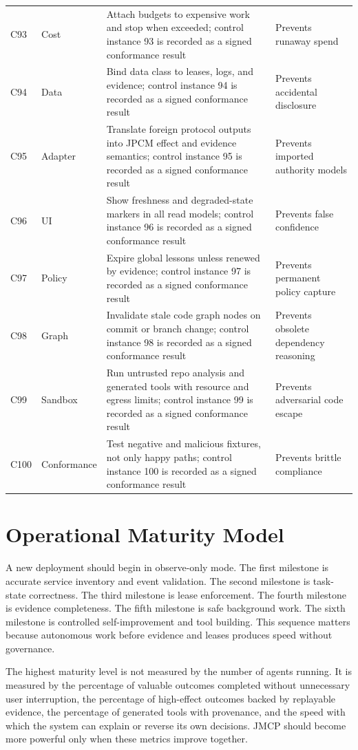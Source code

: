 \documentclass[10pt,journal,onecolumn]{IEEEtran}
\begin{document}
\begin{longtable}{P{0.06\textwidth} P{0.14\textwidth} P{0.48\textwidth} P{0.24\textwidth}}
C93 & Cost & Attach budgets to expensive work and stop when exceeded; control instance 93 is recorded as a signed conformance result & Prevents runaway spend \\
C94 & Data & Bind data class to leases, logs, and evidence; control instance 94 is recorded as a signed conformance result & Prevents accidental disclosure \\
C95 & Adapter & Translate foreign protocol outputs into JPCM effect and evidence semantics; control instance 95 is recorded as a signed conformance result & Prevents imported authority models \\
C96 & UI & Show freshness and degraded-state markers in all read models; control instance 96 is recorded as a signed conformance result & Prevents false confidence \\
C97 & Policy & Expire global lessons unless renewed by evidence; control instance 97 is recorded as a signed conformance result & Prevents permanent policy capture \\
C98 & Graph & Invalidate stale code graph nodes on commit or branch change; control instance 98 is recorded as a signed conformance result & Prevents obsolete dependency reasoning \\
C99 & Sandbox & Run untrusted repo analysis and generated tools with resource and egress limits; control instance 99 is recorded as a signed conformance result & Prevents adversarial code escape \\
C100 & Conformance & Test negative and malicious fixtures, not only happy paths; control instance 100 is recorded as a signed conformance result & Prevents brittle compliance \\
\bottomrule
\end{longtable}

\section{Operational Maturity Model}
A new deployment should begin in observe-only mode. The first milestone is accurate service inventory and event validation. The second milestone is task-state correctness. The third milestone is lease enforcement. The fourth milestone is evidence completeness. The fifth milestone is safe background work. The sixth milestone is controlled self-improvement and tool building. This sequence matters because autonomous work before evidence and leases produces speed without governance.

The highest maturity level is not measured by the number of agents running. It is measured by the percentage of valuable outcomes completed without unnecessary user interruption, the percentage of high-effect outcomes backed by replayable evidence, the percentage of generated tools with provenance, and the speed with which the system can explain or reverse its own decisions. JMCP should become more powerful only when these metrics improve together.
\end{document}
